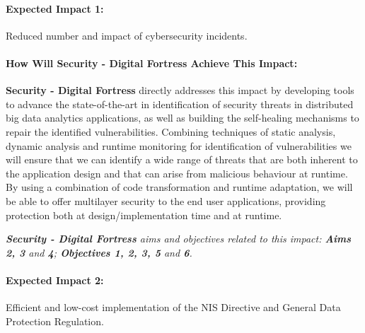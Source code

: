 \documentclass[a4paper,11pt]{article}
\newcommand{\project}[1]{\textbf{#1}\xspace}
\newcommand{\SECURITY}{\project{Security - Digital Fortress}}
\newcommand{\TheProject}{\SECURITY}
\begin{document}
\begin{mdframed}[backgroundcolor=blue!5]
\paragraph{Expected Impact 1:}
Reduced number and impact of cybersecurity incidents.
\end{mdframed}

\begin{mdframed}[backgroundcolor=gray!10]
\paragraph{How Will \TheProject{} Achieve This Impact:}
\TheProject{} directly addresses this impact by developing tools to advance the state-of-the-art in identification of security threats in distributed big data analytics applications, as well as building the self-healing mechanisms to repair the identified vulnerabilities. Combining techniques of static analysis, dynamic analysis and runtime monitoring for identification of vulnerabilities we will ensure that we can identify a wide range of threats that are both inherent to the application design and that can arise from malicious behaviour at runtime. By using a combination of code transformation and runtime adaptation, we will be able to offer multilayer security to the end user applications, providing protection both at design/implementation time and at runtime.

\emph{\TheProject{} aims and objectives related to this impact: \textbf{Aims 2, 3 } and \textbf{4}; \textbf{Objectives 1, 2, 3, 5} and \textbf{6}.}
\end{mdframed}

\begin{mdframed}[backgroundcolor=blue!5]
\paragraph{Expected Impact 2:}
Efficient and low-cost implementation of the NIS Directive and General Data Protection Regulation.
\end{mdframed}
\end{document}
